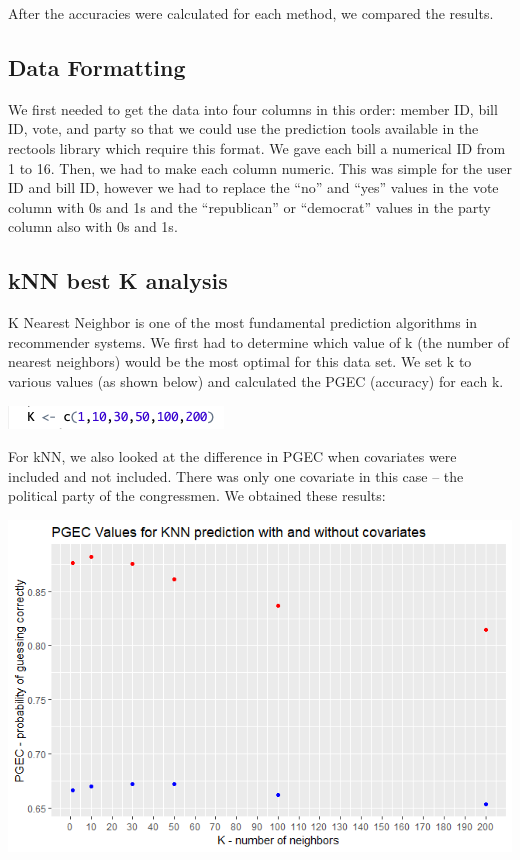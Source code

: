 \documentclass{article}
\begin{document}
After the accuracies were calculated for each method, we compared the results. 

\subsection{Data Formatting}

We first needed to get the data into four columns in this order: member ID, bill ID, vote, and party so that we could use the prediction tools available in the rectools library which require this format. We gave each bill a numerical ID from 1 to 16. Then, we had to make each column numeric. This was simple for the user ID and bill ID, however we had to replace the “no” and “yes” values in the vote column with 0s and 1s and the “republican” or “democrat” values in the party column also with 0s and 1s.

\subsection{kNN best K analysis}



K Nearest Neighbor is one of the most fundamental prediction algorithms in recommender systems. We first had to determine which value of k (the number of nearest neighbors) would be the most optimal for this data set. We set k to various values (as shown below) and calculated the PGEC (accuracy) for each k.

\includegraphics[]{krangeofvalues.png}

For kNN, we also looked at the difference in PGEC when covariates were included and not included. There was only one covariate in this case -- the political party of the congressmen. We obtained these results:

\includegraphics[scale = 0.7]{pgecknn.png}
\end{document}
